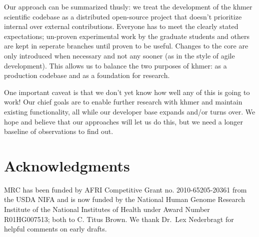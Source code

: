\documentclass[12pt]{article}
\begin{document}
Our approach can be summarized thusly: we treat the development of the khmer
scientific codebase as a distributed open-source project that doesn't
prioritize internal over external contributions. Everyone has to meet the
clearly stated expectations; un-proven experimental work by the graduate
students and others are kept in seperate branches until proven to be useful.
Changes to the core are only introduced when necessary and not any sooner (as
in the style of agile development). This allows us to balance the two purposes
of khmer: as a production codebase and as a foundation for research.

One important caveat is that we don't yet know how well any of this is
going to work!  Our chief goals are to enable further research with
khmer and maintain existing functionality, all while our
developer base expands and/or turns over. We hope and believe that our
approaches will let us do this, but we need a longer baseline of
observations to find out.


\section*{Acknowledgments}

MRC has been funded by AFRI Competitive Grant no. 2010-65205-20361
from the USDA NIFA and is now funded by the National Human Genome
Research Institute of the National Institutes of Health under Award
Number R01HG007513; both to C. Titus Brown.  We thank Dr.\ Lex
Nederbragt for helpful comments on early drafts.







\end{document}

